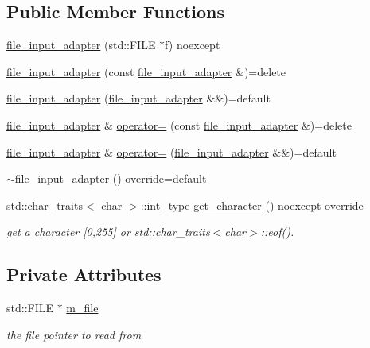 \subsection*{Public Member Functions}
\begin{DoxyCompactItemize}
\item 
\hyperlink{classnlohmann_1_1detail_1_1file__input__adapter_aeade050f2793280503be93feff2ece5b}{file\+\_\+input\+\_\+adapter} (std\+::\+F\+I\+LE $\ast$f) noexcept
\item 
\hyperlink{classnlohmann_1_1detail_1_1file__input__adapter_a308099b496a0cba2123a06fe99a95d02}{file\+\_\+input\+\_\+adapter} (const \hyperlink{classnlohmann_1_1detail_1_1file__input__adapter}{file\+\_\+input\+\_\+adapter} \&)=delete
\item 
\hyperlink{classnlohmann_1_1detail_1_1file__input__adapter_a10b4dec4e8751a4f8a110fa917f0d5a8}{file\+\_\+input\+\_\+adapter} (\hyperlink{classnlohmann_1_1detail_1_1file__input__adapter}{file\+\_\+input\+\_\+adapter} \&\&)=default
\item 
\hyperlink{classnlohmann_1_1detail_1_1file__input__adapter}{file\+\_\+input\+\_\+adapter} \& \hyperlink{classnlohmann_1_1detail_1_1file__input__adapter_ad59bbc7e3f23dd74475c5cb818784e42}{operator=} (const \hyperlink{classnlohmann_1_1detail_1_1file__input__adapter}{file\+\_\+input\+\_\+adapter} \&)=delete
\item 
\hyperlink{classnlohmann_1_1detail_1_1file__input__adapter}{file\+\_\+input\+\_\+adapter} \& \hyperlink{classnlohmann_1_1detail_1_1file__input__adapter_a95adaec9a8c583a46083c4c493981e77}{operator=} (\hyperlink{classnlohmann_1_1detail_1_1file__input__adapter}{file\+\_\+input\+\_\+adapter} \&\&)=default
\item 
\hyperlink{classnlohmann_1_1detail_1_1file__input__adapter_af96552e4560be08b201e62a36e6b6189}{$\sim$file\+\_\+input\+\_\+adapter} () override=default
\item 
std\+::char\+\_\+traits$<$ char $>$\+::int\+\_\+type \hyperlink{classnlohmann_1_1detail_1_1file__input__adapter_a0d4ff48617c8f63c30babdfd09482329}{get\+\_\+character} () noexcept override
\begin{DoxyCompactList}\small\item\em get a character \mbox{[}0,255\mbox{]} or std\+::char\+\_\+traits$<$char$>$\+::eof(). \end{DoxyCompactList}\end{DoxyCompactItemize}
\subsection*{Private Attributes}
\begin{DoxyCompactItemize}
\item 
std\+::\+F\+I\+LE $\ast$ \hyperlink{classnlohmann_1_1detail_1_1file__input__adapter_a164fbe2739ac97e517e22bc1fff1c174}{m\+\_\+file}
\begin{DoxyCompactList}\small\item\em the file pointer to read from \end{DoxyCompactList}\end{DoxyCompactItemize}


